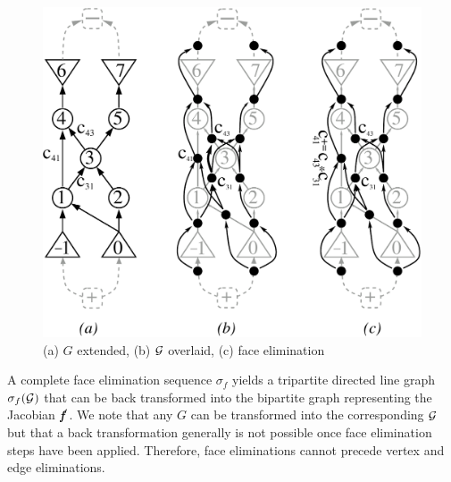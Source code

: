 \documentclass[11pt]{article}
\newcommand{\bmf}{\mbox{\bf\em f}}
\begin{document}
\begin{figure}
\centering\includegraphics[width=.65\textwidth]{face_elims}
\caption{
(a) $G$ extended, 
(b) $\cal G$ overlaid, 
(c) face elimination 
}
\label{fig:face_elims}
\end{figure}
A complete face elimination sequence $\sigma_f$ yields a tripartite 
directed line graph $\sigma_f({\cal G})$ that can be back transformed into 
the bipartite graph representing the Jacobian $\bmf'$.
We note that any $G$ can be transformed into the 
corresponding $\cal G$ but that a back transformation 
generally is not  possible once face elimination steps have been applied. 
Therefore, face eliminations cannot precede vertex and edge 
eliminations.
\end{document}
